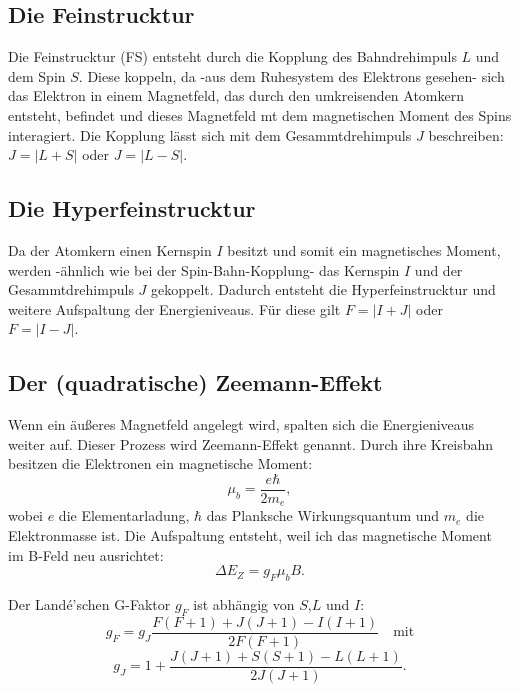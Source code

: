 \subsection{Die Feinstrucktur}
\noindent Die Feinstrucktur (FS) entsteht durch die Kopplung des Bahndrehimpuls $L$ 
und dem Spin $S$. 
Diese koppeln, da 
-aus dem Ruhesystem des Elektrons gesehen-
sich das Elektron in einem Magnetfeld, 
das durch den umkreisenden Atomkern entsteht, befindet
und dieses Magnetfeld mt dem magnetischen Moment des Spins interagiert.
Die Kopplung lässt sich mit dem Gesammtdrehimpuls $J$ beschreiben:
$J= | L + S |$ 
oder 
$J= | L - S |$.

\subsection{Die Hyperfeinstrucktur}
\noindent Da der Atomkern einen Kernspin $I$ besitzt und somit ein magnetisches Moment,
werden -ähnlich wie bei der Spin-Bahn-Kopplung-
das Kernspin $I$ und der Gesammtdrehimpuls $J$ gekoppelt.
Dadurch entsteht die Hyperfeinstrucktur und weitere Aufspaltung der Energieniveaus.
Für diese gilt $F= | I + J |$ oder $F= | I - J|$.

\subsection{Der (quadratische) Zeemann-Effekt}
\noindent Wenn ein äußeres Magnetfeld angelegt wird, 
spalten sich die Energieniveaus weiter auf.
Dieser Prozess wird Zeemann-Effekt genannt.
Durch ihre Kreisbahn besitzen die Elektronen ein magnetische Moment:
\begin{equation}
    \mu_b = \frac{e \hbar}{2 m_e},
\end{equation}
\noindent wobei $e$ die Elementarladung,
$\hbar$ das Planksche Wirkungsquantum und
$m_e$ die Elektronmasse ist.
Die Aufspaltung entsteht, 
weil ich das magnetische Moment im B-Feld neu ausrichtet:
\begin{equation}
   \Delta E_Z = g_F \mu_b B.
\end{equation}

\noindent Der Landé’schen G-Faktor $g_F$ ist abhängig 
von $S$,$L$ und $I$:
\begin{equation}
    g_F= g_J \frac{F \left( F + 1 \right) + J \left( J + 1 \right) 
    - I \left( I + 1 \right)}
    {2 F \left( F + 1 \right)}  \quad \text{mit}
\end{equation}
\begin{equation}
    g_J = 1 + \frac{J \left( J + 1 \right) + S \left( S + 1 \right) 
    - L \left( L + 1 \right)}
    {2 J \left( J + 1 \right)}.
\end{equation}

